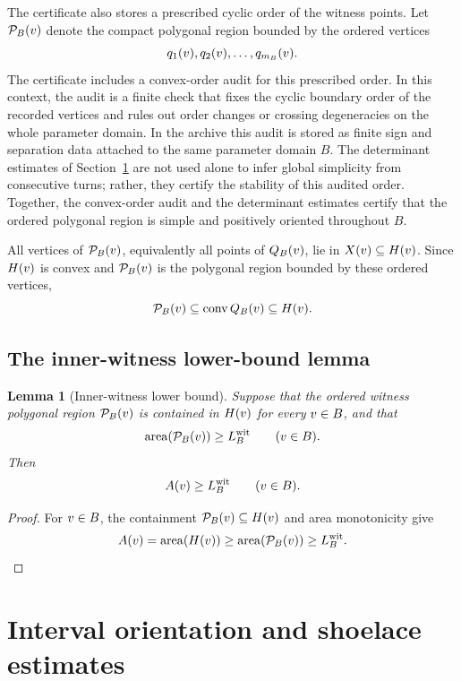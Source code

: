 \documentclass[11pt]{article}
\newtheorem{lemma}{Lemma}
\begin{document}
The certificate also stores a prescribed cyclic order of the witness points.  Let \(\mathcal P_B(v)\) denote the compact polygonal region bounded by the ordered vertices
\[
q_1(v),q_2(v),\ldots,q_{m_B}(v).
\]
The certificate includes a convex-order audit for this prescribed order.  In this context, the audit is a finite check that fixes the cyclic boundary order of the recorded vertices and rules out order changes or crossing degeneracies on the whole parameter domain.  In the archive this audit is stored as finite sign and separation data attached to the same parameter domain \(B\).  The determinant estimates of Section~\ref{sec:interval} are not used alone to infer global simplicity from consecutive turns; rather, they certify the stability of this audited order.  Together, the convex-order audit and the determinant estimates certify that the ordered polygonal region is simple and positively oriented throughout \(B\).

All vertices of \(\mathcal P_B(v)\), equivalently all points of \(Q_B(v)\), lie in \(X(v)\subseteq H(v)\).  Since \(H(v)\) is convex and \(\mathcal P_B(v)\) is the polygonal region bounded by these ordered vertices,
\[
\mathcal P_B(v)\subseteq\operatorname{conv} Q_B(v)\subseteq H(v).
\]

\subsection{The inner-witness lower-bound lemma}

\begin{lemma}[Inner-witness lower bound]\label{lem:inner-witness}
Suppose that the ordered witness polygonal region \(\mathcal P_B(v)\) is contained in \(H(v)\) for every \(v\in B\), and that
\[
\operatorname{area}(\mathcal P_B(v))\ge L_B^{\mathrm{wit}}
\qquad(v\in B).
\]
Then
\[
A(v)\ge L_B^{\mathrm{wit}}
\qquad(v\in B).
\]
\end{lemma}

\begin{proof}
For \(v\in B\), the containment \(\mathcal P_B(v)\subseteq H(v)\) and area monotonicity give
\[
A(v)=\operatorname{area}(H(v))
\ge \operatorname{area}(\mathcal P_B(v))
\ge L_B^{\mathrm{wit}}.
\]
\end{proof}

\section{Interval orientation and shoelace estimates}\label{sec:interval}
\end{document}
